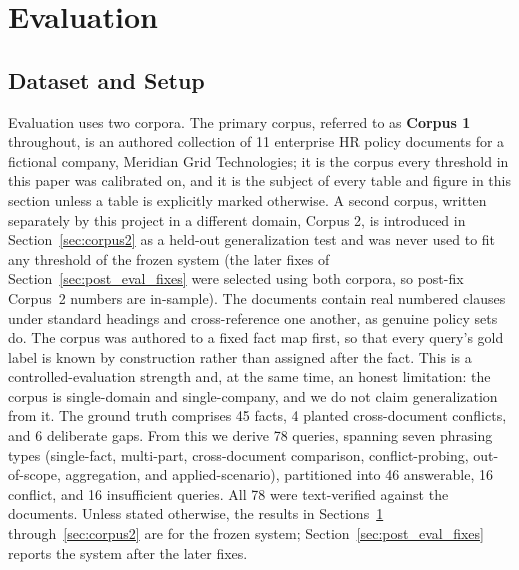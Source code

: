 \documentclass[conference]{IEEEtran}
\begin{document}
\section{Evaluation}
\label{sec:eval}

\subsection{Dataset and Setup}
Evaluation uses two corpora. The primary corpus, referred to as
\textbf{Corpus 1} throughout, is an authored collection of 11 enterprise HR
policy documents for a fictional company, Meridian Grid Technologies; it is
the corpus every threshold in this paper was calibrated on, and it is the
subject of every table and figure in this section unless a table is
explicitly marked otherwise. A second corpus, written separately by this
project in a different domain, Corpus 2, is introduced in
Section~\ref{sec:corpus2} as a held-out generalization test and was never
used to fit any threshold of the frozen system (the later fixes of
Section~\ref{sec:post_eval_fixes} were selected using both corpora, so
post-fix Corpus~2 numbers are in-sample). The documents contain real
numbered clauses under standard headings and cross-reference one another, as
genuine policy sets do. The corpus was authored to a fixed fact map first,
so that every query's gold label is known by construction rather than
assigned after the fact. This is a controlled-evaluation strength and, at
the same time, an honest limitation: the corpus is single-domain and
single-company, and we do not claim generalization from it. The ground
truth comprises 45 facts, 4 planted cross-document conflicts, and 6
deliberate gaps. From this we derive 78 queries, spanning seven phrasing
types (single-fact, multi-part, cross-document comparison, conflict-probing,
out-of-scope, aggregation, and applied-scenario), partitioned into 46
answerable, 16 conflict, and 16 insufficient queries. All 78 were
text-verified against the documents. Unless stated otherwise, the results in
Sections~\ref{sec:eval} through~\ref{sec:corpus2} are for the frozen system;
Section~\ref{sec:post_eval_fixes} reports the system after the later fixes.
\end{document}
